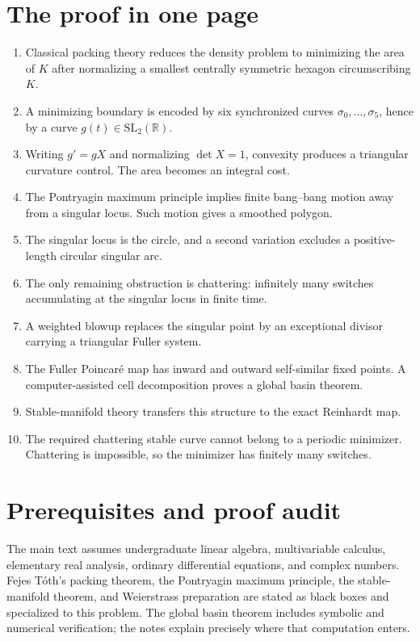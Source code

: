 \section*{The proof in one page}
\begin{enumerate}[leftmargin=2.2em]
\item Classical packing theory reduces the density problem to minimizing the area of $K$ after normalizing a smallest centrally symmetric hexagon circumscribing $K$.
\item A minimizing boundary is encoded by six synchronized curves $\sigma_0,\ldots,\sigma_5$, hence by a curve $g(t)\in\mathrm{SL}_2(\mathbb R)$.
\item Writing $g'=gX$ and normalizing $\det X=1$, convexity produces a triangular curvature control. The area becomes an integral cost.
\item The Pontryagin maximum principle implies finite bang--bang motion away from a singular locus. Such motion gives a smoothed polygon.
\item The singular locus is the circle, and a second variation excludes a positive-length circular singular arc.
\item The only remaining obstruction is chattering: infinitely many switches accumulating at the singular locus in finite time.
\item A weighted blowup replaces the singular point by an exceptional divisor carrying a triangular Fuller system.
\item The Fuller Poincaré map has inward and outward self-similar fixed points. A computer-assisted cell decomposition proves a global basin theorem.
\item Stable-manifold theory transfers this structure to the exact Reinhardt map.
\item The required chattering stable curve cannot belong to a periodic minimizer. Chattering is impossible, so the minimizer has finitely many switches.
\end{enumerate}

\section*{Prerequisites and proof audit}
The main text assumes undergraduate linear algebra, multivariable calculus, elementary real analysis, ordinary differential equations, and complex numbers. Fejes Tóth's packing theorem, the Pontryagin maximum principle, the stable-manifold theorem, and Weierstrass preparation are stated as black boxes and specialized to this problem. The global basin theorem includes symbolic and numerical verification; the notes explain precisely where that computation enters.
